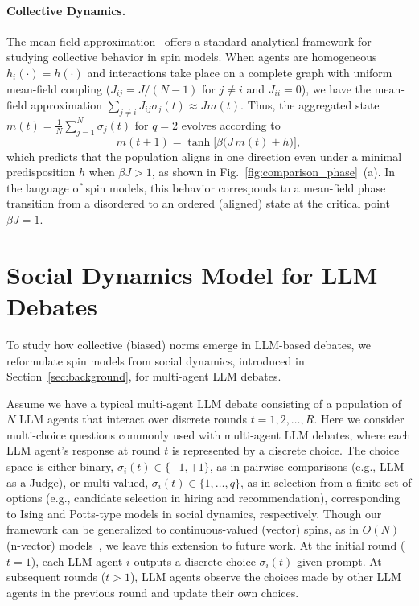 \documentclass{article}
\theoremstyle{plain}
\theoremstyle{definition}
\theoremstyle{remark}
\begin{document}
\paragraph{Collective Dynamics. } 
The mean-field approximation~\cite{goldenfeld2018lectures} offers a standard analytical framework for studying collective behavior in spin models.  
When agents are homogeneous $h_i(\cdot)=h(\cdot)$ and interactions take place on a complete graph with uniform mean-field coupling
($J_{ij}=J/(N-1)$ for $j\neq i$ and $J_{ii}=0$), 
we have the mean-field approximation
$\sum_{j\neq i} J_{ij}\sigma_j(t) \approx J m(t)$.
Thus, the aggregated state $m(t)=\frac{1}{N}\sum_{j=1}^N \sigma_j(t)$ for $q=2$ evolves according to
\begin{equation}\label{eq:mean-field-ising}
m(t+1) = \tanh\bigl[\beta \bigl(J\, m(t) + h\bigr)\bigr],
\end{equation}
which predicts that the population aligns in one direction even under a minimal predisposition $h$ when $\beta J>1$, as shown in Fig.~\ref{fig:comparison_phase}~(a). 
In the language of spin models, this behavior corresponds to a mean-field phase transition from a disordered to an ordered (aligned) state at the critical point $\beta J=1$. 


\section{Social Dynamics Model for LLM Debates}\label{sec:formulation}
To study how collective (biased) norms emerge in LLM-based debates, we reformulate spin models from social dynamics, introduced in Section~\ref{sec:background}, for multi-agent LLM debates. 

Assume we have a typical multi-agent LLM debate consisting of a population
of $N$ LLM agents that interact over discrete rounds $t=1,2,\dots,R$.
Here we consider multi-choice questions commonly used with multi-agent
LLM debates, where each LLM agent's response at round $t$ is represented by a discrete choice.
The choice space is either binary, $\sigma_i(t) \in \{-1, +1\}$, as in pairwise comparisons (e.g., LLM-as-a-Judge), or multi-valued, $\sigma_i(t) \in \{1, \dots, q\}$, as in selection from a finite set of options (e.g., candidate selection in hiring and recommendation), 
corresponding to Ising and Potts-type models in social dynamics, respectively. 
Though our framework can be generalized to continuous-valued (vector) spins, as in $O(N)$ (n-vector) models~\cite{friedli2017statistical}, we leave this extension to future work. 
At the initial round ($t=1$), each LLM agent $i$ outputs a discrete choice $\sigma_i(t)$ given prompt. 
At subsequent rounds ($t>1$), LLM agents observe the choices made by other LLM agents in the previous round and update their own choices. 
\end{document}
